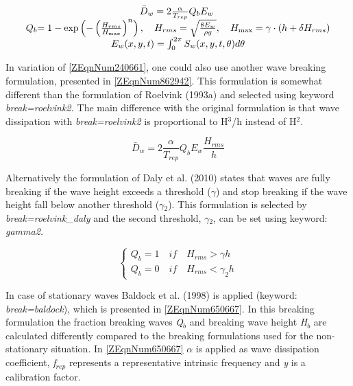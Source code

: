 \documentclass{article}
\begin{document}
\noindent 
\begin{equation} \label{ZEqnNum240661} 
\begin{array}{c} {\bar{D}_{w} =2\frac{\alpha }{T_{rep} } Q_{b} E_{w} {\rm \; }} \\ {Q_{b} {\rm =1-exp}\left(-\left(\frac{H_{rms} }{H_{\max } } \right)^{n} \right),\quad H_{rms} =\sqrt{\frac{8E_{w} }{\rho g} } ,\quad H_{\max } =\gamma \cdot (h+\delta H_{rms} )} \\ {E_{w} (x,y,t)=\int _{0}^{2\pi }S_{w} (x,y,t,\theta )d\theta  } \end{array} 
\end{equation} 


\noindent In variation of \eqref{ZEqnNum240661}, one could also use another wave breaking formulation, presented in \eqref{ZEqnNum862942}. This formulation is somewhat different than the formulation of Roelvink (1993a) and selected using keyword \textit{break=roelvink2.} The main difference with the original formulation is that wave dissipation with \textit{break=roelvink2} is proportional to H${}^{3}$/h instead of H${}^{2}$.

\noindent 
\begin{equation} \label{ZEqnNum862942} 
\bar{D}_{w} =2\frac{\alpha }{T_{rep} } Q_{b} E_{w} \frac{H_{rms} }{h}  
\end{equation} 


\noindent Alternatively the formulation of Daly et al. (2010) states that waves are fully breaking if the wave height exceeds a threshold (\textit{$\gamma $}) and stop breaking if the wave height fall below another threshold (\textit{$\gamma $${}_{2}$}). This formulation is selected by \textit{break=roelvink\_daly} and the second threshold, \textit{$\gamma $${}_{2}$}, can be set using keyword: \textit{gamma2.}

\noindent 
\begin{equation} \label{2.13)} 
\left\{\begin{array}{l} {Q_{b} =1\quad if\quad H_{rms} >\gamma h} \\ {Q_{b} =0\quad if\quad H_{rms} <\gamma _{2} h} \end{array}\right.  
\end{equation} 


\noindent In case of stationary waves Baldock et al. (1998) is applied (keyword: \textit{break=baldock}), which is presented in \eqref{ZEqnNum650667}. In this breaking formulation the fraction breaking waves \textit{Q${}_{b}$} and breaking wave height \textit{H${}_{b}$} are calculated differently compared to the breaking formulations used for the non-stationary situation. In \eqref{ZEqnNum650667} \textit{$\alpha $} is applied as wave dissipation coefficient, \textit{f${}_{rep}$} represents a representative intrinsic frequency and \textit{y} is a calibration factor.
\end{document}
